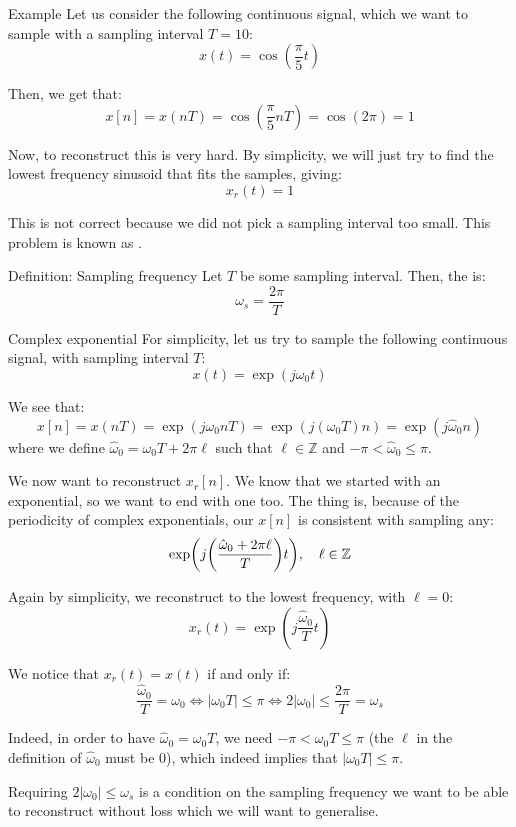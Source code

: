 \documentclass[a4paper]{article}
\begin{document}
\begin{parag}{Example}
    Let us consider the following continuous signal, which we want to sample with a sampling interval $T = 10$: 
    \[x\left(t\right) = \cos\left(\frac{\pi}{5}t\right)\]
    
    Then, we get that: 
    \[x\left[n\right] = x\left(nT\right) = \cos\left(\frac{\pi}{5} nT\right) = \cos\left(2\pi\right) = 1\]
    
    Now, to reconstruct this is very hard. By simplicity, we will just try to find the lowest frequency sinusoid that fits the samples, giving: 
    \[x_r\left(t\right) = 1\]
    
    This is not correct because we did not pick a sampling interval too small. This problem is known as .
\end{parag}

\begin{parag}{Definition: Sampling frequency}
    Let $T$ be some sampling interval. Then, the  is: 
    \[\omega_s = \frac{2\pi}{T}\]
\end{parag}


\begin{parag}{Complex exponential}
    For simplicity, let us try to sample the following continuous signal, with sampling interval $T$: 
    \[x\left(t\right) = \exp\left(j \omega_0 t\right)\]
    
    We see that: 
    \[x\left[n\right] = x\left(nT\right) = \exp\left(j \omega_0 n T\right) = \exp\left(j \left(\omega_0 T\right)n\right) = \exp\left(j \hat{\omega}_0n\right)\]
    where we define $\hat{\omega}_0 = \omega_0 T + 2\pi \ell $ such that $\ell \in \mathbb{Z}$ and $-\pi < \hat{\omega}_0 \leq \pi$.

    We now want to reconstruct $x_r\left[n\right]$. We know that we started with an exponential, so we want to end with one too. The thing is, because of the periodicity of complex exponentials, our $x\left[n\right]$ is consistent with sampling any: 
    \[\exp\left(j \left(\frac{\hat{\omega}_0 + 2\pi \ell }{T}\right)t\right), \mathspace \ell \in \mathbb{Z}\]
    
    Again by simplicity, we reconstruct to the lowest frequency, with $\ell = 0$: 
    \[x_r\left(t\right) = \exp\left(j \frac{\hat{\omega}_0}{T}t\right)\]
    
    We notice that $x_r\left(t\right) = x\left(t\right)$ if and only if: 
    \[\frac{\hat{\omega}_0}{T} = \omega_0 \iff \left|\omega_0 T\right| \leq \pi \iff 2 \left|\omega_0\right| \leq \frac{2\pi}{T} = \omega_s\]

    Indeed, in order to have $\hat{\omega}_0 = \omega_0 T$, we need $-\pi < \omega_0 T \leq \pi$ (the $\ell $ in the definition of $\hat{\omega}_0$ must be 0), which indeed implies that $\left|\omega_0 T\right| \leq \pi$.

    Requiring $2 \left|\omega_0\right| \leq \omega_s$ is a condition on the sampling frequency we want to be able to reconstruct without loss which we will want to generalise.
\end{parag}
\end{document}
